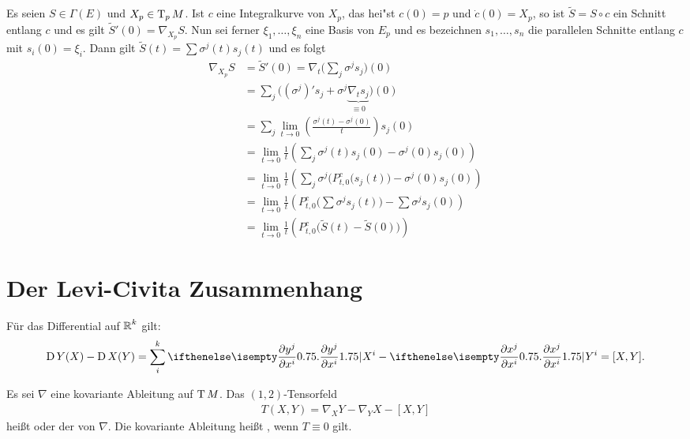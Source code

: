 Es seien $S \in \Gamma(E)$ und $X_p \in \operatorname{T}_pM$. Ist $c$ eine Integralkurve von $X_p$, das hei"st $c(0) = p$ und $\dot c(0) = X_p$, so ist $\tilde S = S \circ c$ ein Schnitt entlang $c$ und es gilt $\tilde S'(0) = \nabla_{X_p} S$. Nun sei ferner $\xi_1,\ldots ,\xi_n$ eine Basis von $E_p$ und es bezeichnen $s_1,\ldots ,s_n$ die parallelen Schnitte  entlang $c$ mit $s_i(0) = \xi_i$. Dann gilt $\tilde S(t) = \sum \sigma^j(t)s_j(t)$ und es folgt
\begin{align*}
	\nabla_{X_p}S &= \tilde S'(0) = \nabla_t \big( \sum_j \sigma^j s_j \big)(0)\\
	&= \sum_j \big( (\sigma^j)' s_j + \sigma^j \underbrace{\nabla_t s_j}_{\equiv 0} \big) (0)\\
	&= \sum_j \lim_{t \to 0} \left( \frac{\sigma^j(t) - \sigma^j(0)}{t} \right) s_j(0)\\
	&= \lim_{t \to 0} \frac{1}{t} \left( \sum_j \sigma^j(t) s_j(0) - \sigma^j(0) s_j(0) \right)\\
	&= \lim_{t \to 0} \frac{1}{t} \left( \sum_j \sigma^j \big(P_{t,0}^c (s_j(t) \big) - \sigma^j(0) s_j(0) \right)\\
	&= \lim_{t \to 0} \frac{1}{t} \left( P_{t,0}^c \big( \sum \sigma^j s_j(t) \big) - \sum \sigma^j s_j(0) \right)\\
	&= \lim_{t \to 0} \frac{1}{t} \left( P_{t,0}^c \big( \tilde S(t) - \tilde S(0) \big) \right)
\end{align*}



\section{Der Levi-Civita Zusammenhang}

Für das  Differential auf $\operatorname{\mathbb{R}}^k$ gilt:
\begin{align*}
  \D Y(X) - \D X(Y) = \sum_i^k\pdifffrac{y^j}{x^i}X^i - \pdifffrac{x^j}{x^i}Y^i = [X,Y].
\end{align*}

\begin{Dfn}
  Es sei $\nabla$ eine kovariante Ableitung auf $\operatorname{T} M$. Das $(1,2)$-Tensorfeld
  \begin{align*}
    T(X,Y) = \nabla_XY - \nabla_YX - [X,Y]
  \end{align*}
heißt  oder der  von $\nabla$.
Die kovariante Ableitung heißt , wenn $T \equiv 0$ gilt.
\end{Dfn}

